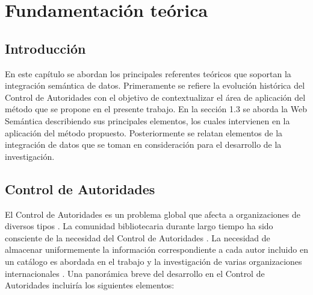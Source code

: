 \chapter{\large Fundamentación teórica}

\pagestyle{fancy}
\lhead{}
\chead{}
\lfoot{}
\cfoot{}
\rfoot{\thepage}
\renewcommand{\headrulewidth}{0.4pt}
 \vspace{-1cm}

\section{Introducción}
En este capítulo se abordan los principales referentes teóricos que soportan la integración semántica de datos. Primeramente se refiere la evolución histórica del Control de Autoridades con el objetivo de contextualizar el área de aplicación del método que se propone en el presente trabajo. En la sección 1.3 se aborda la Web Semántica describiendo sus principales elementos, los cuales intervienen en la aplicación del método propuesto. Posteriormente se relatan elementos de la integración de datos que se toman en consideración para el desarrollo de la investigación.
\section{Control de Autoridades}
El Control de Autoridades es un problema global que afecta a organizaciones de diversos tipos \citep{Leiva-Mederos2013}. La comunidad bibliotecaria durante largo tiempo ha sido consciente de la necesidad del Control de Autoridades \citep{Harper2007,Tillett2009,Leiva-Mederos2013,Carrasco2016}. La necesidad de almacenar uniformemente la información correspondiente a cada autor incluido en un catálogo es abordada en el trabajo y la investigación de varias organizaciones internacionales \citep{Leiva-Mederos2013}. Una panorámica breve del desarrollo en el Control de Autoridades incluiría los siguientes elementos:

